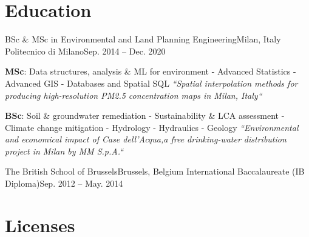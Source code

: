 \documentclass[letterpaper,11pt]{article}
\begin{document}


\section{Education}
\begin{sectionElementsList}
  \experienceElement
  {BSc \& MSc in Environmental and Land Planning Engineering}{Milan, Italy}
  {Politecnico di Milano}{Sep. 2014 -- Dec. 2020}
  { {
        \scriptsize
        \begin{hangparas}{1em}{1}
          \textbf{MSc}: Data structures, analysis \& ML for environment - Advanced Statistics - Advanced GIS - Databases and Spatial SQL
          \newline
          \textit{“Spatial interpolation methods for producing high-resolution PM2.5
            concentration maps in Milan, Italy“}

          \textbf{BSc}:  Soil \& groundwater remediation - Sustainability \& LCA assessment - Climate change mitigation - Hydrology - Hydraulics - Geology
          \newline
          \textit{“Environmental and economical impact of Case dell'Acqua,a
            free drinking-water distribution project in Milan by MM S.p.A.“}
        \end{hangparas}
      }
  }{}

  \experienceElement
  {The British School of Brussels}{Brussels, Belgium}
  {International Baccalaureate (IB Diploma)}{Sep. 2012 -- May. 2014}
  {}{}

\end{sectionElementsList}

\section{Licenses}

\end{document}
